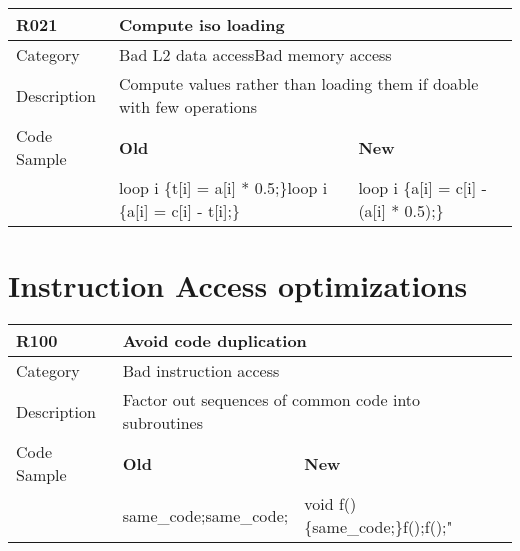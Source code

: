 \begin{tabular}{|p{0.9in}|p{2.0in}|p{2.0in}|} \hline
\textbf{R021}       & \multicolumn{2}{|p{4.0in}|}{\textbf{Compute iso loading}} \\ \hline
Category            & \multicolumn{2}{|p{4.0in}|}{Bad L2 data access\newline Bad memory access } \\ \hline
Description         & \multicolumn{2}{|p{4.0in}|}{Compute values rather than loading them if doable with few operations} \\ \hline
Code Sample         & \textbf{Old} & \textbf{New} \\ \hline
                    & loop i \{\newline   t[i] = a[i] * 0.5;\newline \}\newline loop i \{\newline   a[i] = c[i] - t[i];\newline \}
                    & loop i \{\newline   a[i] = c[i] - (a[i] * 0.5);\newline \} \\ \hline
\end{tabular}

\section{Instruction Access optimizations}
\label{sec:Instruction_Access_Optimizations}

\begin{tabular}{|p{0.9in}|p{2.0in}|p{2.0in}|} \hline
\textbf{R100}       & \multicolumn{2}{|p{4.0in}|}{\textbf{Avoid code duplication}} \\ \hline
Category            & \multicolumn{2}{|p{4.0in}|}{Bad instruction access} \\ \hline
Description         & \multicolumn{2}{|p{4.0in}|}{Factor out sequences of common code into subroutines} \\ \hline
Code Sample         & \textbf{Old} & \textbf{New} \\ \hline
                    & same\_code;\newline same\_code;
                    & void f() \{same\_code;\}\newline f();\newline f();" \\ \hline
\end{tabular}

